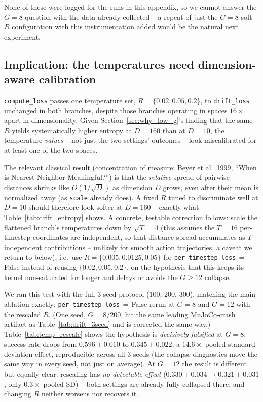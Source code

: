 \documentclass[11pt]{article}
\begin{document}
None of these were logged for the runs in this appendix, so we cannot
answer the $G=8$ question with the data already collected -- a repeat
of just the $G=8$ soft-$R$ configuration with this instrumentation
added would be the natural next experiment.

\subsection{Implication: the temperatures need dimension-aware calibration}
\label{sec:temp_calibration}

\texttt{compute\_loss} passes one temperature set, $R=\{0.02,0.05,0.2\}$,
to \texttt{drift\_loss} unchanged in both branches, despite those branches
operating in spaces $16\times$ apart in dimensionality. Given
Section~\ref{sec:why_low_g}'s finding that the same $R$ yields
systematically higher entropy at $D=160$ than at $D=10$, the temperature
\emph{values} -- not just the two settings' outcomes -- look miscalibrated
for at least one of the two spaces.

The relevant classical result (concentration of measure; Beyer et al.\
1999, ``When is Nearest Neighbor Meaningful?'') is that the \emph{relative}
spread of pairwise distances shrinks like $O(1/\sqrt{D})$ as dimension $D$
grows, even after their mean is normalized away (as \texttt{scale} already
does). A fixed $R$ tuned to discriminate well at $D=10$ should therefore
look softer at $D=160$ -- exactly what Table~\ref{tab:drift_entropy}
shows. A concrete, testable correction follows: scale the flattened
branch's temperatures down by $\sqrt{T}=4$ (this assumes the $T=16$
per-timestep coordinates are independent, so that distance-spread
accumulates as $T$ independent contributions -- unlikely for smooth
action trajectories, a caveat we return to below), i.e.\ use
$R=\{0.005,0.0125,0.05\}$ for \texttt{per\_timestep\_loss}\,$=$\,False
instead of reusing $\{0.02,0.05,0.2\}$, on the hypothesis that this keeps
its kernel non-saturated for longer and delays or avoids the $G\ge12$
collapse.

We ran this test with the full 3-seed protocol ($100$, $200$, $300$),
matching the main ablation exactly: \texttt{per\_timestep\_loss}\,$=$\,False
rerun at $G=8$ and $G=12$ with the rescaled $R$. (One seed, $G=8$/$200$,
hit the same leading MuJoCo-crash artifact as Table~\ref{tab:drift_3seed}
and is corrected the same way.) Table~\ref{tab:temp_rescale} shows the
hypothesis is \emph{decisively falsified} at $G=8$: success rate drops
from $0.596\pm0.010$ to $0.345\pm0.022$, a $14.6\times$ pooled-standard-deviation
effect, reproducible across all 3 seeds (the collapse diagnostics move
the same way in every seed, not just on average). At $G=12$ the result is
different but equally clear: rescaling has \emph{no detectable effect}
($0.330\pm0.034 \to 0.321\pm0.031$, only $0.3\times$ pooled SD) -- both
settings are already fully collapsed there, and changing $R$ neither
worsens nor recovers it.
\end{document}

